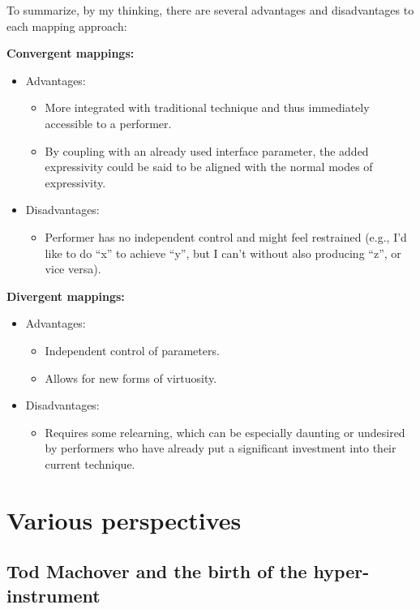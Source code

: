 \documentclass[12pt,twoside,maitrise]{dms_ks}
\theoremstyle{definition}
\begin{document}
{{To summarize, by my thinking, there are several advantages and disadvantages to each mapping approach:

\textbf{Convergent mappings:}

\begin{itemize}
  \item Advantages:
  \begin{itemize}
    \item More integrated with traditional technique and thus immediately accessible to a performer.
    \item By coupling with an already used interface parameter, the added expressivity could be said to be aligned with the normal modes of expressivity.
  \end{itemize}
  \item Disadvantages:
  \begin{itemize}
    \item Performer has no independent control and might feel restrained (e.g., I'd like to do “x” to achieve “y”, but I can't without also producing “z”, or vice versa).
  \end{itemize}
\end{itemize}

\textbf{Divergent mappings:}

\begin{itemize}
  \item Advantages:
  \begin{itemize}
    \item Independent control of parameters.
    \item Allows for new forms of virtuosity.
  \end{itemize}
  \item Disadvantages:
  \begin{itemize}
    \item Requires some relearning, which can be especially daunting or undesired by performers who have already put a significant investment into their current technique.
  \end{itemize}
\end{itemize}

\section{Various perspectives}

\subsection{Tod Machover and the birth of the hyper-instrument}

}}
\end{document}
